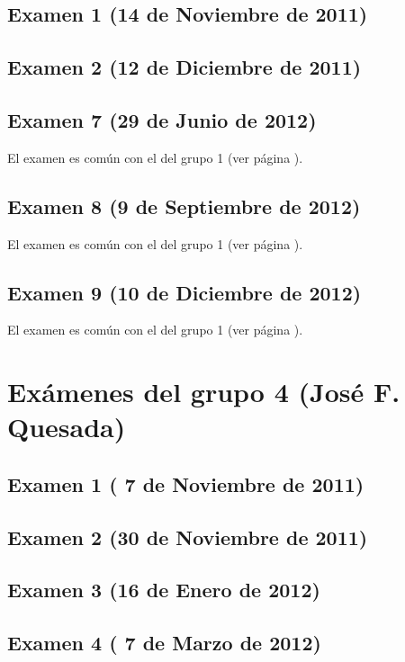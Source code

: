 \documentclass[a4paper,12pt,twoside]{book}
\begin{document}
\subsection{Examen 1 (14 de Noviembre de 2011)}
\subsection{Examen 2 (12 de Diciembre de 2011)}
\subsection{Examen 7 (29 de Junio de 2012)} 
El examen es común con el del grupo 1 (ver página \pageref{examen_11_12_1_8}).
\subsection{Examen 8 (9 de Septiembre de 2012)} 
El examen es común con el del grupo 1 (ver página \pageref{examen_11_12_1_9}).
\subsection{Examen 9 (10 de Diciembre de 2012)} 
El examen es común con el del grupo 1 (ver página \pageref{examen_11_12_1_10}).

\section{Exámenes del grupo 4 (José F. Quesada)}
\subsection{Examen 1 ( 7 de Noviembre de 2011)}
\subsection{Examen 2 (30 de Noviembre de 2011)}
\subsection{Examen 3 (16 de Enero de 2012)}
\subsection{Examen 4 ( 7 de Marzo de 2012)}
\end{document}
